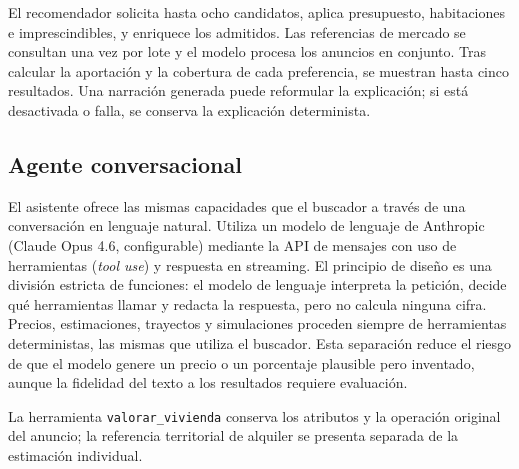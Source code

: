\documentclass[11pt,a4paper]{article}
\newcounter{anexo}
\newcounter{anexosub}[anexo]
\begin{document}
El recomendador solicita hasta ocho candidatos, aplica presupuesto, habitaciones e imprescindibles, y enriquece los admitidos. Las referencias de mercado se consultan una vez por lote y el modelo procesa los anuncios en conjunto. Tras calcular la aportación y la cobertura de cada preferencia, se muestran hasta cinco resultados. Una narración generada puede reformular la explicación; si está desactivada o falla, se conserva la explicación determinista.

%
\subsection*{\theanexo\hspace{0.3em}\hspace{0.45em}Agente conversacional}

El asistente ofrece las mismas capacidades que el buscador a través de una conversación en lenguaje natural. Utiliza un modelo de lenguaje de Anthropic (Claude Opus 4.6, configurable) mediante la API de mensajes con uso de herramientas (\emph{tool use}) y respuesta en streaming. El principio de diseño es una división estricta de funciones: el modelo de lenguaje interpreta la petición, decide qué herramientas llamar y redacta la respuesta, pero no calcula ninguna cifra. Precios, estimaciones, trayectos y simulaciones proceden siempre de herramientas deterministas, las mismas que utiliza el buscador. Esta separación reduce el riesgo de que el modelo genere un precio o un porcentaje plausible pero inventado, aunque la fidelidad del texto a los resultados requiere evaluación.

La herramienta \texttt{valorar\_vivienda} conserva los atributos y la operación original del anuncio; la referencia territorial de alquiler se presenta separada de la estimación individual.
\end{document}
